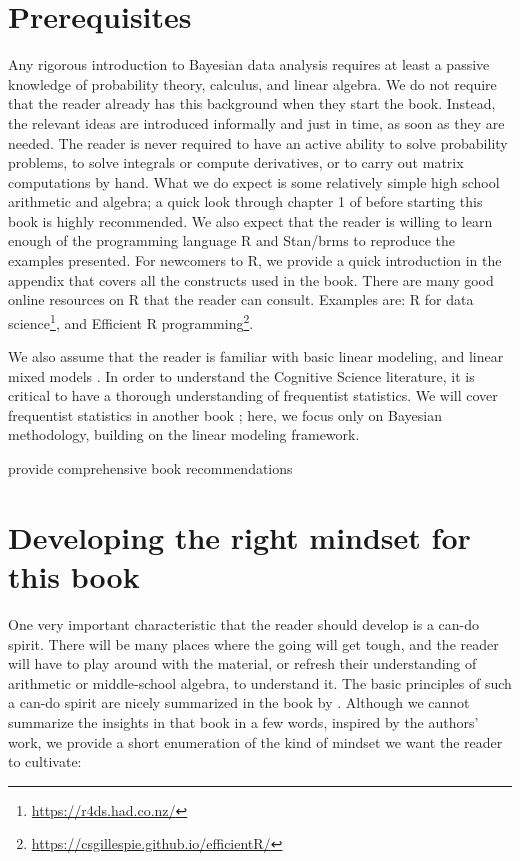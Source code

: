 \documentclass[12pt,]{krantz}
\makeatletter
\renewcommand{\href}[2]{#2\footnote{\url{#1}}}
\newenvironment{kframe}{%
\medskip{}
\setlength{\fboxsep}{.8em}
 \def\at@end@of@kframe{}%
 \ifinner\ifhmode%
  \def\at@end@of@kframe{\end{minipage}}%
  \begin{minipage}{\columnwidth}%
 \fi\fi%
 \def\FrameCommand##1{\hskip\@totalleftmargin \hskip-\fboxsep
 \colorbox{shadecolor}{##1}\hskip-\fboxsep
     \hskip-\linewidth \hskip-\@totalleftmargin \hskip\columnwidth}%
 \MakeFramed {\advance\hsize-\width
   \@totalleftmargin\z@ \linewidth\hsize
   \@setminipage}}%
 {\par\unskip\endMakeFramed%
 \at@end@of@kframe}
\newenvironment{rmdblock}[1]
  {
  \begin{itemize}
  \renewcommand{\labelitemi}{
    \raisebox{-.7\height}[0pt][0pt]{
      {\setkeys{Gin}{width=3em,keepaspectratio}\texttt{[image: images/\#1]}}
    }
  }
  \setlength{\fboxsep}{1em}
  \begin{kframe}
  \item
  }
  {
  \end{kframe}
  \end{itemize}
  }
\newenvironment{rmdnote}
  {\begin{rmdblock}{note}}
  {\end{rmdblock}}
\theoremstyle{definition}
\theoremstyle{definition}
\theoremstyle{definition}
\theoremstyle{remark}
\makeatother
\begin{document}
\hypertarget{prerequisites}{%
\section{Prerequisites}\label{prerequisites}}

Any rigorous introduction to Bayesian data analysis requires at least a passive knowledge of probability theory, calculus, and linear algebra. We do not require that the reader already has this background when they start the book. Instead, the relevant ideas are introduced informally and just in time, as soon as they are needed. The reader is never required to have an active ability to solve probability problems, to solve integrals or compute derivatives, or to carry out matrix computations by hand. What we do expect is some relatively simple high school arithmetic and algebra; a quick look through chapter 1 of \citet{gill2006essential} before starting this book is highly recommended. We also expect that the reader is willing to learn enough of the programming language R \citep{R-base} and Stan/brms to reproduce the examples presented.
For newcomers to R, we provide a quick introduction in the appendix that covers all the constructs used in the book.
There are many good online resources on R that the reader can consult. Examples are: \href{https://r4ds.had.co.nz/}{R for data science}, and \href{https://csgillespie.github.io/efficientR/}{Efficient R programming}.

We also assume that the reader is familiar with basic linear modeling, and linear mixed models \citep[\citet{baayen2008mixed}]{lme4new}. In order to understand the Cognitive Science literature, it is critical to have a thorough understanding of frequentist statistics. We will cover frequentist statistics in another book \citep{VasishthEtAlFreq2021}; here, we focus only on Bayesian methodology, building on the linear modeling framework.

\begin{rmdnote}
provide comprehensive book recommendations
\end{rmdnote}

\hypertarget{developing-the-right-mindset-for-this-book}{%
\section{Developing the right mindset for this book}\label{developing-the-right-mindset-for-this-book}}

One very important characteristic that the reader should develop is a can-do spirit. There will be many places where the going will get tough, and the reader will have to play around with the material, or refresh their understanding of arithmetic or middle-school algebra, to understand it.
The basic principles of such a can-do spirit are nicely summarized in the book by \citet{burger}. Although we cannot summarize the insights in that book in a few words, inspired by the authors' work, we provide a short enumeration of the kind of mindset we want the reader to cultivate:
\end{document}
